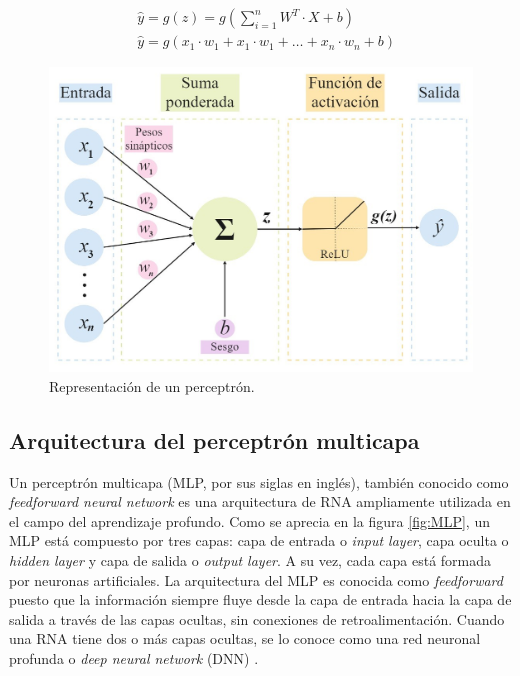 \begin{equation}\label{eq:perceptron}
\begin{split}
	&\hat{y} = g(z) = g( \sum_{i=1}^{n} W^T \cdot X + b) \\
				&\hat{y} = g(x_1 \cdot w_1 + x_1 \cdot w_1 + … + x_n \cdot w_n + b)
\end{split}
\end{equation}

\begin{figure}[h!]
	\centering
	\includegraphics[width=\textwidth]{./Figures/Perceptron.jpg}
	\caption{Representación de un perceptrón.}
	\label{fig:Perceptron}
\end{figure}


\subsection{Arquitectura del perceptrón multicapa}

Un perceptrón multicapa (MLP, por sus siglas en inglés), también conocido como \emph{feedforward neural network} es 
una arquitectura de RNA ampliamente utilizada en el campo del aprendizaje profundo. Como se aprecia en la figura \ref{fig:MLP}, 
un MLP está compuesto por tres capas: capa de entrada o \emph{input layer}, capa oculta 
o \emph{hidden layer} y capa de salida o \emph{output layer}. 
A su vez, cada capa está formada por neuronas artificiales. La arquitectura del MLP es conocida como \emph{feedforward} 
puesto que la información siempre fluye desde la capa de entrada hacia la capa de salida a través de las capas ocultas, 
sin conexiones de retroalimentación. Cuando una RNA tiene dos o más capas ocultas, se lo conoce como una red neuronal 
profunda o \emph{deep neural network} (DNN) \citep{CITE:35} \citep{CITE:44}. 

